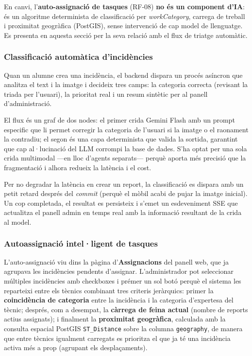 \documentclass[10pt,a4paper,twocolumn,twoside]{article}
\begin{document}
		En canvi, l'\textbf{auto-assignació de tasques} (RF-08) \textbf{no és un component d'IA}: és un algoritme determinista de classificació per \textit{workCategory}, carrega de treball i proximitat geogràfica (PostGIS), sense intervenció de cap model de llenguatge. Es presenta en aquesta secció per la seva relació amb el flux de triatge automàtic.
		
		\subsubsection{Classificació automàtica d'incidències}
		
		Quan un alumne crea una incidència, el backend dispara un procés asíncron que analitza el text i la imatge i decideix tres camps: la categoria correcta (revisant la triada per l'usuari), la prioritat real i un resum sintètic per al panell d'administració. 
		
		El flux és un graf de dos nodes: el primer crida Gemini Flash amb un prompt especific que li permet corregir la categoria de l'usuari si la imatge o el raonament la contradiu; el segon és una capa determinista que valida la sortida, garantint que cap al·lucinació del LLM corrompi la base de dades. S'ha optat per una sola crida multimodal —en lloc d'agents separats— perquè aporta més precisió que la fragmentació i alhora redueix la latència i el cost.
		
		Per no degradar la latència en crear un report, la classificació es dispara amb un petit retard després del \textit{commit} (perquè el mòbil acabi de pujar la imatge inicial). Un cop completada, el resultat es persisteix i s'emet un esdeveniment SSE que actualitza el panell admin en temps real amb la informació resultant de la crida al model. 
		
		
		
		\subsubsection{Autoassignació intel·ligent de tasques}
		\label{sec:autoassign}
		
		L'auto-assignació viu dins la pàgina d'\textbf{Assignacions} del panell web, que ja agrupava les incidències pendents d'assignar. L'administrador pot seleccionar múltiples incidències amb checkboxes i prémer un sol botó perquè el sistema les reparteixi entre els tècnics combinant tres criteris jeràrquics: primer la \textbf{coincidència de categoria} entre la incidència i la categoria d'expertesa del tècnic; després, com a desempat, la \textbf{càrrega de feina actual} (nombre de reports actius assignats); i finalment la \textbf{proximitat geogràfica}, calculada amb la consulta espacial PostGIS \texttt{ST\_Distance} sobre la columna \texttt{geography}, de manera que entre tècnics igualment carregats es prioritza el que ja té una incidència activa més a prop (agrupant els desplaçaments). 
		
\end{document}
